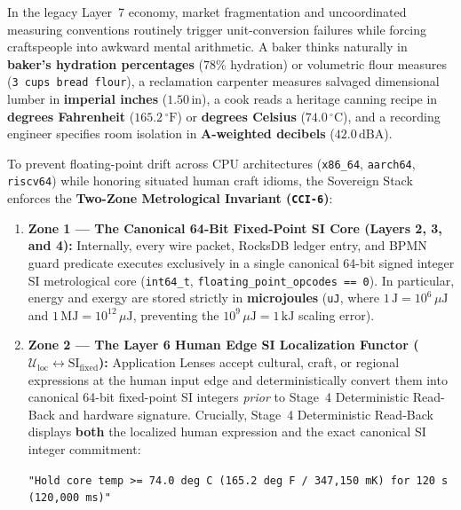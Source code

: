 In the legacy Layer~7 economy, market fragmentation and uncoordinated measuring conventions routinely trigger unit-conversion failures while forcing craftspeople into awkward mental arithmetic. A baker thinks naturally in \textbf{baker's hydration percentages} ($78\%$ hydration) or volumetric flour measures (\texttt{3 cups bread flour}), a reclamation carpenter measures salvaged dimensional lumber in \textbf{imperial inches} ($1.50\,\mathrm{in}$), a cook reads a heritage canning recipe in \textbf{degrees Fahrenheit} ($165.2\,^\circ\mathrm{F}$) or \textbf{degrees Celsius} ($74.0\,^\circ\mathrm{C}$), and a recording engineer specifies room isolation in \textbf{A-weighted decibels} ($42.0\,\mathrm{dBA}$).

To prevent floating-point drift across CPU architectures (\texttt{x86\_64}, \texttt{aarch64}, \texttt{riscv64}) while honoring situated human craft idioms, the Sovereign Stack enforces the \textbf{Two-Zone Metrological Invariant (\texttt{CCI-6})}:
\begin{enumerate}
    \item \textbf{Zone 1 --- The Canonical 64-Bit Fixed-Point SI Core (Layers 2, 3, and 4):} Internally, every wire packet, RocksDB ledger entry, and BPMN guard predicate executes exclusively in a single canonical 64-bit signed integer SI metrological core (\texttt{int64\_t}, \texttt{floating\_point\_opcodes == 0}). In particular, energy and exergy are stored strictly in \textbf{microjoules} (\texttt{uJ}, where $1\,\mathrm{J} = 10^6\,\mu\mathrm{J}$ and $1\,\mathrm{MJ} = 10^{12}\,\mu\mathrm{J}$, preventing the $10^9\,\mu\mathrm{J} = 1\,\mathrm{kJ}$ scaling error).
    \item \textbf{Zone 2 --- The Layer 6 Human Edge SI Localization Functor ($\mathcal{U}_{\mathrm{loc}} \leftrightarrow \mathrm{SI}_{\mathrm{fixed}}$):} Application Lenses accept cultural, craft, or regional expressions at the human input edge and deterministically convert them into canonical 64-bit fixed-point SI integers \emph{prior} to Stage~4 Deterministic Read-Back and hardware signature. Crucially, Stage~4 Deterministic Read-Back displays \textbf{both} the localized human expression and the exact canonical SI integer commitment:
    \begin{center}
    \small\texttt{"Hold core temp >= 74.0 deg C (165.2 deg F / 347,150 mK) for 120 s (120,000 ms)"}
    \end{center}
\end{enumerate}

